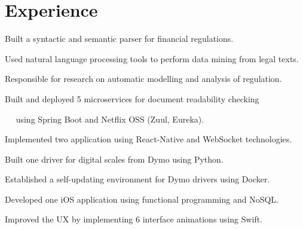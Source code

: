 \section{Experience}

\begin{experience}[from = May 2019, until = April 2020,
    company = RegulAItion,
    position = Software Engineer,
    key = {Developed a question generator for legal English using Kotlin.}]
\item Built a syntactic and semantic parser for financial regulations.
\item Used natural language processing tools to perform data mining from legal texts.
\item Responsible for research on automatic modelling and analysis of regulation.
\item Built and deployed 5 microservices for document readability checking
\item $\quad$ using Spring Boot and Netflix OSS (Zuul, Eureka).
\end{experience}

\begin{experience}[from = July 2018,
    until = December 2018,
    company = X2Mobile,
    position = Software Developer,
    key = {Used behaviour-driven development to increase the product's testability by 24\%.}]
\item Implemented two application using React-Native and WebSocket technologies.
\item Built one driver for digital scales from Dymo using Python.
\item Established a self-updating environment for Dymo drivers using Docker.
\end{experience}

\begin{experience}[from = June 2017,
    until = August 2017,
    company = SniperLabs,
    position = Swift Developer Intern,
    key = {Implemented $\approx240$ test cases using test-driven development.}]
\item Developed one iOS application using functional programming and NoSQL.
\item Improved the UX by implementing 6 interface animations using Swift.
\end{experience}